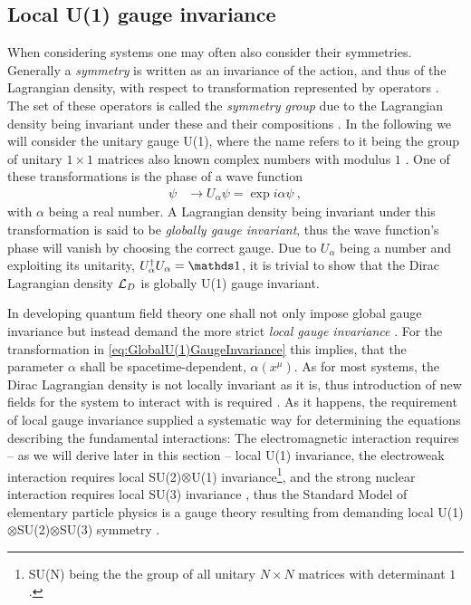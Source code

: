 \documentclass[../main.tex]{subfiles} %
\begin{document}
\subsection{Local U(1) gauge invariance} \label{sec:ContinuumQFT_LocalU(1)GaugeInvariance}

When considering systems one may often also consider their symmetries. Generally a \emph{symmetry} is written as an invariance of the action, and thus of the Lagrangian density, with respect to transformation represented by operators \cite{peskin_introToQFT_1995}. The set of these operators is called the \emph{symmetry group} due to the Lagrangian density being invariant under these and their compositions \cite{panyella_masterThesis_2019}. In the following we will consider the unitary gauge U(1), where the name refers to it being the group of unitary $1\times1$ matrices also known complex numbers with modulus $1$ \cite{peskin_introToQFT_1995}. One of these transformations is the phase of a wave function
\begin{align} \label{eq:GlobalU(1)GaugeInvariance}
    \psi &\rightarrow U_\alpha \psi = \exp{i\alpha}\psi \: ,
\end{align}
with $\alpha$ being a real number. A Lagrangian density being invariant under this transformation is said to be \emph{globally gauge invariant}, thus the wave function's phase will vanish by choosing the correct gauge. Due to $U_\alpha$ being a number and exploiting its unitarity, $U_\alpha\dagger U_\alpha = \id$, it is trivial to show that the Dirac Lagrangian density $\mathcal{L}_D$ is globally U(1) gauge invariant.

In developing quantum field theory one shall not only impose global gauge invariance but instead demand the more strict \emph{local gauge invariance} \cite{griffiths_introToElementaryParticles_2008}. For the transformation in \cref{eq:GlobalU(1)GaugeInvariance} this implies, that the parameter $\alpha$ shall be spacetime-dependent, $\alpha(x^\mu)$. As for most systems, the Dirac Lagrangian density is not locally invariant as it is, thus introduction of new fields for the system to interact with is required \cite{panyella_masterThesis_2019}. As it happens, the requirement of local gauge invariance supplied a systematic way for determining the equations describing the fundamental interactions: The electromagnetic interaction requires -- as we will derive later in this section -- local U(1) invariance, the electroweak interaction requires local SU(2)$\otimes$U(1) invariance\footnote{SU(N) being the the group of all unitary $N \times N$ matrices with determinant $1$ \cite{peskin_introToQFT_1995}.}, and the strong nuclear interaction requires local SU(3) invariance \cite{stanford_QFT, griffiths_introToElementaryParticles_2008}, thus the Standard Model of elementary particle physics is a gauge theory resulting from demanding local U(1)$\otimes$SU(2)$\otimes$SU(3) symmetry \cite{stanford_historyOfQFT}.
\end{document}
